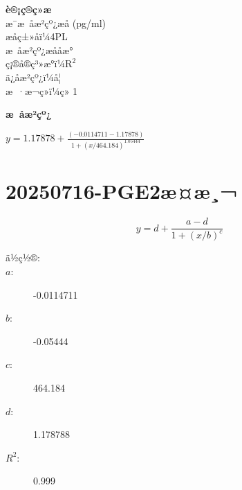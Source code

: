 \documentclass[UTF8,10pt,a4paper,fontset=fandol]{ctexart}
\newcommand{\fieldvalue}[1]{#1}
\begin{document}
\medskip
\noindent\textbf{è®¡ç®ç»æ}\\
\hspace*{1em}æ¯æ åæ²çº¿æå (pg/ml)\\
\hspace*{1em}æåç±»åï¼4PL\\
\hspace*{1em}æ åæ²çº¿æååæ°\\
\hspace*{1em}ç¡®å®ç³»æ°ï¼\(\mathrm{R}^2\)\\
\hspace*{1em}ä¿å­æ²çº¿ï¼å¦\\
\hspace*{1em}æ ·æ¬ç»ï¼ç» 1

\begin{center}
\textbf{æ åæ²çº¿}

\vspace{0.5em}

\vspace{0.5em}
\(\displaystyle y=1.17878+\frac{(-0.0114711-1.17878)}
 {1+(x/464.184)^{1.05444}}\)
\end{center}

\newpage

\section{20250716-PGE2æ¤æ¸¬}

\[
y = d + \frac{a-d}{1+(x/b)^c}
\]

\begin{description}
  \item[ä½ç½®:]
  \item[$a$:] 
  \fieldvalue{-0.0114711}
  \item[$b$:] 
  \fieldvalue{-0.05444}
  \item[$c$:] 
  \fieldvalue{464.184}
  \item[$d$:] 
  \fieldvalue{1.178788}
  \item[$R^2$:] 
  \fieldvalue{0.999}
\end{description}
\end{document}
